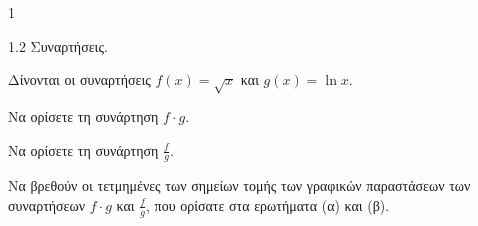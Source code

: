 \begin{ylh}{1}
    \item 1.2 Συναρτήσεις.
\end{ylh}
Δίνονται οι συναρτήσεις $f(x) = \sqrt{x}$ και $g(x) = \ln x$.
\begin{alist}
\item Να ορίσετε τη συνάρτηση $f \cdot g$. 
\item Να ορίσετε τη συνάρτηση $\frac{f}{g}$. 
\item Να βρεθούν οι τετμημένες των σημείων τομής των γραφικών παραστάσεων των συναρτήσεων $f \cdot g$ και $\frac{f}{g}$, που ορίσατε στα ερωτήματα (α) και (β). 
\end{alist}